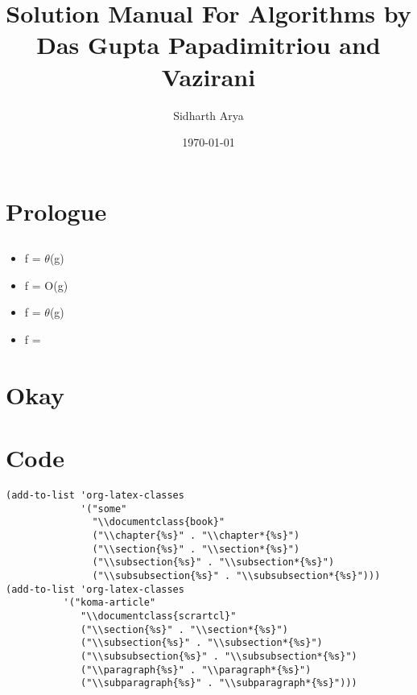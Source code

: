\documentclass{book}
\author{Sidharth Arya}
\date{\today}
\title{Solution Manual For Algorithms by Das Gupta Papadimitriou and Vazirani}
\begin{document}
\maketitle
\frontmatter
\setcounter{tocdepth}{0}
\tableofcontents
\chapter{Prologue}
\label{sec:orgf2b83d9}
\section{}
\label{sec:orge029877}
\begin{itemize}
\item f = \(\theta\)(g)
\item f = O(g)
\item f = \(\theta\)(g)
\item f = 
\mainmatter
\end{itemize}
\chapter{Okay}
\label{sec:org8b234ea}
\backmatter
\chapter{Code}
\label{sec:orgdc99317}
\begin{verbatim}
(add-to-list 'org-latex-classes
             '("some"
               "\\documentclass{book}"
               ("\\chapter{%s}" . "\\chapter*{%s}")
               ("\\section{%s}" . "\\section*{%s}")
               ("\\subsection{%s}" . "\\subsection*{%s}")
               ("\\subsubsection{%s}" . "\\subsubsection*{%s}")))
(add-to-list 'org-latex-classes
          '("koma-article"
             "\\documentclass{scrartcl}"
             ("\\section{%s}" . "\\section*{%s}")
             ("\\subsection{%s}" . "\\subsection*{%s}")
             ("\\subsubsection{%s}" . "\\subsubsection*{%s}")
             ("\\paragraph{%s}" . "\\paragraph*{%s}")
             ("\\subparagraph{%s}" . "\\subparagraph*{%s}")))
\end{verbatim}
\end{document}
